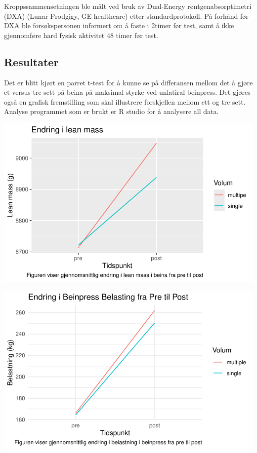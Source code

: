 \documentclass[
  letterpaper,
  DIV=11,
  numbers=noendperiod]{scrreprt}
\begin{document}
Kroppssammensetningen ble målt ved bruk av Dual-Energy
røntgenabsorptimetri (DXA) (Lunar Prodgigy, GE healthcare) etter
standardprotokoll. På forhånd før DXA ble forsøkspersonen informert om å
faste i 2timer før test, samt å ikke gjennomføre hard fysisk aktivitet
48 timer før test.

\subsection{Resultater}\label{resultater}

Det er blitt kjørt en parret t-test for å kunne se på differansen mellom
det å gjøre et versus tre sett på beina på maksimal styrke ved unlatiral
beinpress. Det gjøres også en grafisk fremstilling som skal illustrere
forskjellen mellom ett og tre sett. Analyse programmet som er brukt er R
studio for å analysere all data.

\includegraphics{05-repeated-measurements_files/figure-pdf/unnamed-chunk-3-1.pdf}

\includegraphics{05-repeated-measurements_files/figure-pdf/unnamed-chunk-5-1.pdf}
\end{document}
